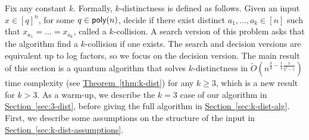 \documentclass{article}
\renewcommand{\sec}[1]{\hyperref[sec:#1]{Section~\ref*{sec:#1}}}
\newcommand{\thm}[1]{\hyperref[thm:#1]{Theorem~\ref*{thm:#1}}}
\renewcommand{\>}{\rangle}
\newcommand{\<}{\langle}
\renewcommand{\(}{\left(}
\renewcommand{\)}{\right)}
\begin{document}
Fix any constant $k$. Formally, $k$-distinctness is defined as follows. Given an input $x\in [q]^n$, for some $q\in {\sf poly}(n)$, decide if there exist distinct $a_1,\dots,a_k\in [n]$ such that $x_{a_1}=\dots=x_{a_k}$, called a $k$-collision. A search version of this problem asks that the algorithm find a $k$-collision if one exists. The search and decision versions are equivalent up to log factors, so we focus on the decision version. The main result of this section is a quantum algorithm that solves $k$-distinctness in $\widetilde{O}(n^{\frac{3}{4}-\frac{1}{4}\frac{1}{2^k-1}})$ time complexity (see \thm{k-dist}) for any $k\geq 3$, which is a new result for $k>3$. As a warm-up, we describe the $k=3$ case of our algorithm in \sec{3-dist}, before giving the full algorithm in \sec{k-dist-alg}. First, we describe some assumptions on the structure of the input in \sec{k-dist-assumptions}. 
\end{document}

